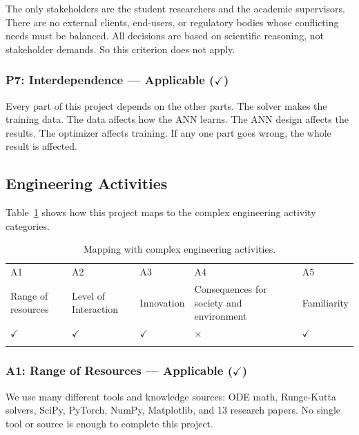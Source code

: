 The only stakeholders are the student researchers and the academic supervisors. There are no external clients, end-users, or regulatory bodies whose conflicting needs must be balanced. All decisions are based on scientific reasoning, not stakeholder demands. So this criterion does not apply.

\subsubsection{P7: Interdependence --- Applicable ($\checkmark$)}

Every part of this project depends on the other parts. The solver makes the training data. The data affects how the ANN learns. The ANN design affects the results. The optimizer affects training. If any one part goes wrong, the whole result is affected.


\subsection{Engineering Activities}

Table~\ref{tab:e_act} shows how this project maps to the complex engineering activity categories.

\begin{center}
    \begin{table}[ht]
        \centering
        \caption{Mapping with complex engineering activities.}
        \begin{tabular}{|p{}|p{}|p{}|p{}|p{}|}
        \hline
        A1& A2& A3& A4& A5\\
        Range of resources & Level of Interaction & Innovation & Consequences for society and environment & Familiarity\\
        \hline 
        $\checkmark$ & $\checkmark$ & $\checkmark$ & $\times$ & $\checkmark$\\
        &&&&\\
        \hline 
        \end{tabular}
        \label{tab:e_act}
    \end{table}
\end{center}

\subsubsection{A1: Range of Resources --- Applicable ($\checkmark$)}

We use many different tools and knowledge sources: ODE math, Runge-Kutta solvers, SciPy, PyTorch, NumPy, Matplotlib, and 13 research papers. No single tool or source is enough to complete this project.


